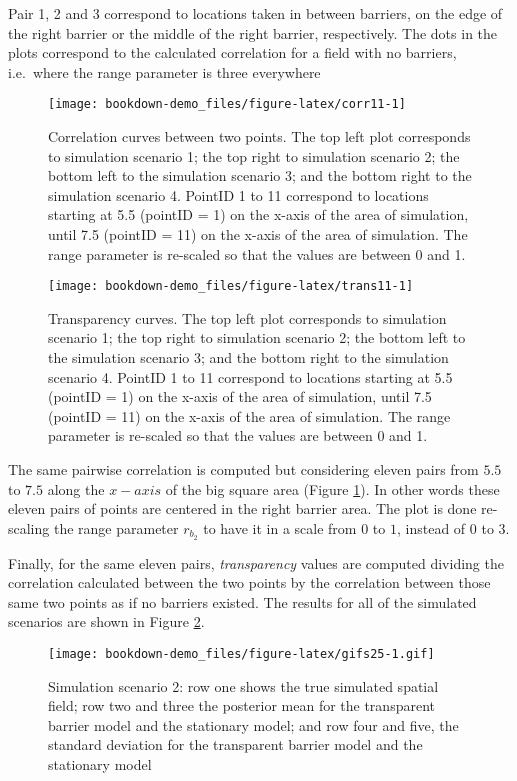 \documentclass[
]{book}
\begin{document}
Pair 1, 2 and 3 correspond to locations taken in between barriers, on the edge of the right barrier or the middle of the right barrier, respectively. The dots in the plots correspond to the calculated correlation for a field with no barriers, i.e.~where the range parameter is three everywhere

\begin{figure}
\texttt{[image: bookdown-demo\_files/figure-latex/corr11-1]} \caption{Correlation curves between two points. The top left plot corresponds to simulation scenario 1; the top right to simulation scenario 2; the bottom left to the simulation scenario 3; and the bottom right to the simulation scenario 4. PointID 1 to 11 correspond to locations starting at 5.5 (pointID = 1) on the x-axis of the area of simulation, until 7.5 (pointID = 11) on the x-axis of the area of simulation. The range parameter is re-scaled so that the values are between 0 and 1.}\label{fig:corr11}
\end{figure}

\begin{figure}
\texttt{[image: bookdown-demo\_files/figure-latex/trans11-1]} \caption{Transparency curves. The top left plot corresponds to simulation scenario 1; the top right to simulation scenario 2; the bottom left to the simulation scenario 3; and the bottom right to the simulation scenario 4. PointID 1 to 11 correspond to locations starting at 5.5 (pointID = 1) on the x-axis of the area of simulation, until 7.5 (pointID = 11) on the x-axis of the area of simulation. The range parameter is re-scaled so that the values are between 0 and 1.}\label{fig:trans11}
\end{figure}

The same pairwise correlation is computed but considering eleven pairs from \(5.5\) to \(7.5\) along the \(x-axis\) of the big square area (Figure \ref{fig:corr11}). In other words these eleven pairs of points are centered in the right barrier area. The plot is done re-scaling the range parameter \(r_{b_2}\) to have it in a scale from \(0\) to \(1\), instead of \(0\) to \(3\).

Finally, for the same eleven pairs, \emph{transparency} values are computed dividing the correlation calculated between the two points by the correlation between those same two points as if no barriers existed. The results for all of the simulated scenarios are shown in Figure \ref{fig:trans11}.

\begin{figure}
\centering
\texttt{[image: bookdown-demo\_files/figure-latex/gifs25-1.gif]}
\caption{\label{fig:gifs25}Simulation scenario 2: row one shows the true simulated spatial field; row two and three the posterior mean for the transparent barrier model and the stationary model; and row four and five, the standard deviation for the transparent barrier model and the stationary model}
\end{figure}
\end{document}
